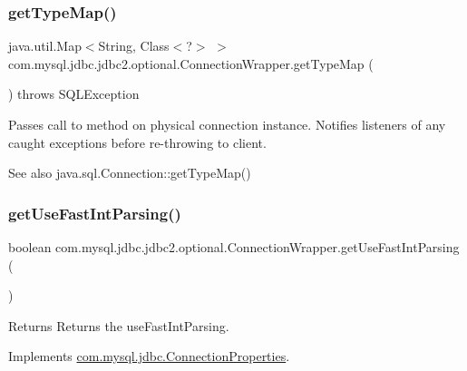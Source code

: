 \subsubsection{\texorpdfstring{get\+Type\+Map()}{getTypeMap()}}
{\footnotesize\ttfamily java.\+util.\+Map$<$String, Class$<$?$>$ $>$ com.\+mysql.\+jdbc.\+jdbc2.\+optional.\+Connection\+Wrapper.\+get\+Type\+Map (\begin{DoxyParamCaption}{ }\end{DoxyParamCaption}) throws S\+Q\+L\+Exception}

Passes call to method on physical connection instance. Notifies listeners of any caught exceptions before re-\/throwing to client.

\begin{DoxySeeAlso}{See also}
java.\+sql.\+Connection\+::get\+Type\+Map() 
\end{DoxySeeAlso}
\mbox{\label{classcom_1_1mysql_1_1jdbc_1_1jdbc2_1_1optional_1_1_connection_wrapper_a4f29d0eb16ff4042f8c91983bc766bdc}} 
\subsubsection{\texorpdfstring{get\+Use\+Fast\+Int\+Parsing()}{getUseFastIntParsing()}}
{\footnotesize\ttfamily boolean com.\+mysql.\+jdbc.\+jdbc2.\+optional.\+Connection\+Wrapper.\+get\+Use\+Fast\+Int\+Parsing (\begin{DoxyParamCaption}{ }\end{DoxyParamCaption})}

\begin{DoxyReturn}{Returns}
Returns the use\+Fast\+Int\+Parsing. 
\end{DoxyReturn}


Implements \mbox{\hyperlink{interfacecom_1_1mysql_1_1jdbc_1_1_connection_properties_af48fc4f6629e4ada4cf9bc8668207e1c}{com.\+mysql.\+jdbc.\+Connection\+Properties}}.

